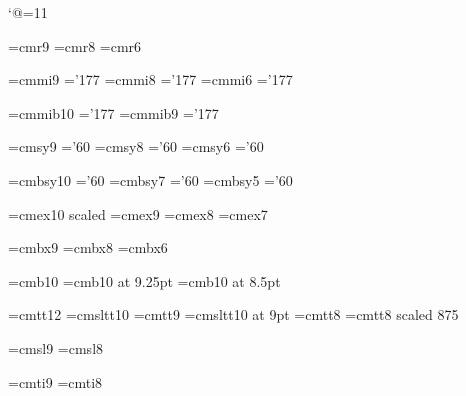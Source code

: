 


\newif\ifproofmode
\proofmodetrue %



\catcode`@=11 %

\font\ninerm=cmr9
\font\eightrm=cmr8
\font\sixrm=cmr6

\font\ninei=cmmi9  \skewchar\ninei='177
\font\eighti=cmmi8  \skewchar\eighti='177
\font\sixi=cmmi6  \skewchar\sixi='177

\font\tenbi=cmmib10  \skewchar\tenbi='177
\font\ninebi=cmmib9  \skewchar\ninebi='177

\font\ninesy=cmsy9  \skewchar\ninesy='60
\font\eightsy=cmsy8  \skewchar\eightsy='60
\font\sixsy=cmsy6  \skewchar\sixsy='60

\font\tenbsy=cmbsy10  \skewchar\tenbsy='60
\font\sevenbsy=cmbsy7  \skewchar\sevenbsy='60
\font\fivebsy=cmbsy5  \skewchar\fivebsy='60

\font\elevenex=cmex10 scaled\magstephalf
\font\nineex=cmex9
\font\eightex=cmex8
\font\sevenex=cmex7

\font\ninebf=cmbx9
\font\eightbf=cmbx8
\font\sixbf=cmbx6

\font\tenthinbf=cmb10
\font\ninethinbf=cmb10 at 9.25pt
\font\eightthinbf=cmb10 at 8.5pt

\font\twelvett=cmtt12  \hyphenchar{}  %
\font\tensltt=cmsltt10  \hyphenchar{}
\font\ninett=cmtt9  \hyphenchar{}
\font\ninesltt=cmsltt10 at 9pt  \hyphenchar{}
\font\eighttt=cmtt8  \hyphenchar{}
\font\seventt=cmtt8 scaled 875  \hyphenchar{}

\font\ninesl=cmsl9
\font\eightsl=cmsl8

\font\nineit=cmti9
\font\eightit=cmti8

